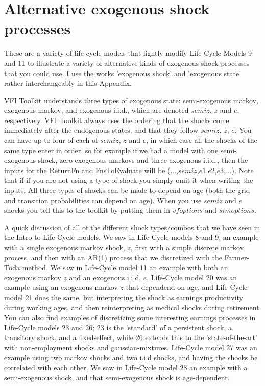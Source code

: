 \section{Alternative exogenous shock processes} \label{app:exogshocks}
These are a variety of life-cycle models that lightly modify Life-Cycle Models 9 and 11 to illustrate a variety of alternative kinds of exogenous shock processes that you could use. I use the works 'exogenous shock' and 'exogenous state' rather interchangeably in this Appendix.

VFI Toolkit understands three types of exogenous state: semi-exogenous markov, exogenous markov, and exogenous i.i.d., which are denoted $semiz$, $z$ and $e$, respectively. VFI Toolkit always uses the ordering that the shocks come immediately after the endogenous states, and that they follow $semiz$, $z$, $e$. You can have up to four of each of $semiz$, $z$ and $e$, in which case all the shocks of the same type enter in order, so for example if we had a model with one semi-exogenous shock, zero exogenous markovs and three exogenous i.i.d., then the inputs for the ReturnFn and FnsToEvaluate will be (...,$semiz$,$e1$,$e2$,$e3$,...). Note that if if you are not using a type of shock you simply omit it when writing the inputs. All three types of shocks can be made to depend on age (both the grid and transition probabilities can depend on age). When you use $semiz$ and $e$ shocks you tell this to the toolkit by putting them in $vfoptions$ and $simoptions$.

A quick discussion of all of the different shock types/combos that we have seen in the Intro to Life-Cycle models. We saw in Life-Cycle models 8 and 9, an example with a single exogenous markov shock, $z$, first with a simple discrete markov process, and then with an AR(1) process that we discretized with the Farmer-Toda method. We saw in Life-Cycle model 11 an example with both an exogenous markov $z$ and an exogenous i.i.d. $e$. Life-Cycle model 20 was an example using an exogenous markov $z$ that dependend on age, and Life-Cycle model 21 does the same, but interpreting the shock as earnings productivity during working ages, and then reinterpreting as medical shocks during retirement. You can also find examples of discretizing some interesting earnings processes in Life-Cycle models 23 and 26; 23 is the 'standard' of a persistent shock, a transitory shock, and a fixed-effect, while 26 extends this to the 'state-of-the-art' with non-employment shocks and gaussian-mixtures. Life-Cycle model 27 was an example using two markov shocks and two i.i.d shocks, and having the shocks be correlated with each other. We saw in Life-Cycle model 28 an example with a semi-exogenous shock, and that semi-exogenous shock is age-dependent.

